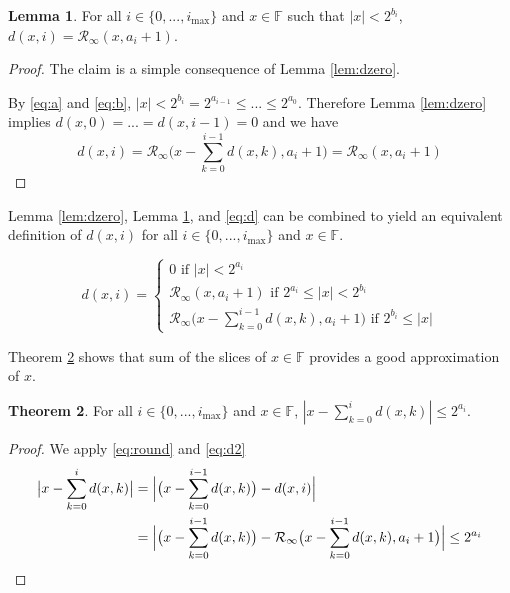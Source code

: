 \documentclass[12pt]{article}
\providecommand{\F}{\ensuremath{\mathbb{F}}}
\providecommand{\max}{\ensuremath{\text{max}}}
\providecommand{\roundtonearestinfty}{\ensuremath{\mathcal{R}_\text{$\infty$}}}
\theoremstyle{definition}
\newtheorem{thm}{Theorem}[section]
\newtheorem{lem}[thm]{Lemma}
\numberwithin{equation}{section}
\numberwithin{figure}{section}
\begin{document}
    \begin{samepage}
    \begin{lem}
      For all $i \in \{0, ..., i_{\max}\}$ and $x \in \F$ such that $|x| < 2^{b_i}$, $d(x, i) = \roundtonearestinfty(x, a_i + 1)$.
      \label{lem:dmiddle}
    \end{lem}
    \end{samepage}

    \begin{proof}
      The claim is a simple consequence of Lemma \ref{lem:dzero}.

      By  \eqref{eq:a} and \eqref{eq:b}, $|x| < 2^{b_i} = 2^{a_{i - 1}} \leq  ... \leq 2^{a_0}$. Therefore Lemma \ref{lem:dzero} implies $d(x, 0) = ... = d(x, i - 1) = 0$ and we have \begin{equation*}
        d(x, i) = \roundtonearestinfty\bigl(x - \sum\limits_{k = 0}^{i - 1}d(x, k), a_{i} + 1\bigr) = \roundtonearestinfty(x, a_{i} + 1)
      \end{equation*}
    \end{proof}

    Lemma \ref{lem:dzero}, Lemma \ref{lem:dmiddle}, and \eqref{eq:d} can be combined to yield an equivalent definition of $d(x, i)$ for all $i \in \{0, ..., i_{\max}\}$ and $x \in \F$.

    \begin{equation}
      d(x, i) = \begin{cases}0 \text{ if } |x| < 2^{a_i}\\ \roundtonearestinfty(x, a_i + 1) \text{ if } 2^{a_i} \leq |x| < 2^{b_i}\\\roundtonearestinfty\bigl(x - \sum\limits_{k=0}^{i - 1}d(x,k), a_i + 1\bigr) \text{ if } 2^{b_i} \leq |x| \end{cases}
      \label{eq:d2}
    \end{equation}

    Theorem \ref{thm:dround} shows that sum of the slices of $x \in \F$ provides a good approximation of $x$.

    \begin{samepage}
    \begin{thm}
      For all $i \in \{0, ..., i_{\max}\}$ and $x \in \F$, $|x - \sum \limits_{k = 0}^id(x, k)| \leq 2^{a_i}$.
      \label{thm:dround}
    \end{thm}
    \end{samepage}

    \begin{proof}
      We apply  \eqref{eq:round} and \eqref{eq:d2}
      \begin{align*}
        \bigl|x - \sum \limits_{k = 0}^{i}d(x, k)\bigr| & = \Bigl|\bigl(x - \sum \limits_{k = 0}^{i - 1}d(x, k)\bigr) - d(x, i)\Bigr| \\
         & = \Bigl|\bigl(x - \sum \limits_{k = 0}^{i - 1}d(x, k)\bigr) - \roundtonearestinfty\bigl(x - \sum \limits_{k = 0}^{i - 1}d(x, k), a_{i} + 1\bigr)\Bigr| \leq 2^{a_{i}}
      \end{align*}
    \end{proof}
\end{document}
